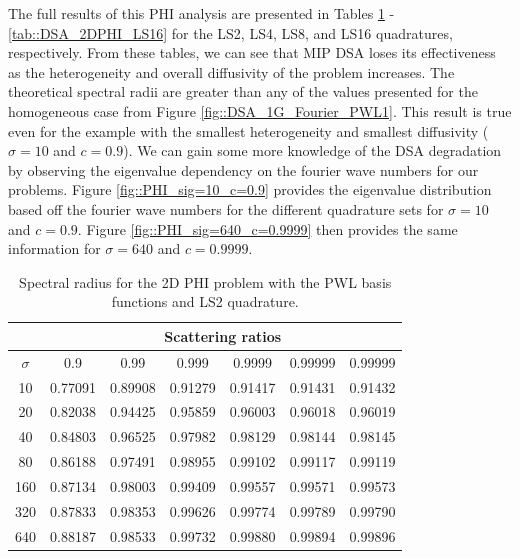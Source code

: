 The full results of this PHI analysis are presented in Tables \ref{tab::DSA_2DPHI_LS2} - \ref{tab::DSA_2DPHI_LS16} for the LS2, LS4, LS8, and LS16 quadratures, respectively. From these tables, we can see that MIP DSA loses its effectiveness as the heterogeneity and overall diffusivity of the problem increases. The theoretical spectral radii are greater than any of the values presented for the homogeneous case from Figure \ref{fig::DSA_1G_Fourier_PWL1}. This result is true even for the example with the smallest heterogeneity and smallest diffusivity ($\sigma=10$ and $c=0.9$). We can gain some more knowledge of the DSA degradation by observing the eigenvalue dependency on the fourier wave numbers for our problems. Figure \ref{fig::PHI_sig=10_c=0.9} provides the eigenvalue distribution based off the fourier wave numbers for the different quadrature sets for $\sigma=10$ and $c=0.9$. Figure \ref{fig::PHI_sig=640_c=0.9999} then provides the same information for $\sigma=640$ and $c=0.9999$.

\begin{table}
\caption{Spectral radius for the 2D PHI problem with the PWL basis functions and LS2 quadrature.}
\begin{center}
\def\arraystretch{1.6}
\begin{tabular}{|c|c|c|c|c|c|c|}
\hline
& \multicolumn{6}{c}{Scattering ratios}\vline\\
\hline
$\sigma$ & 0.9 & 0.99& 0.999& 0.9999& 0.99999& 0.99999 \\
\hline
10  &0.77091&0.89908&0.91279&0.91417&0.91431&0.91432 \\
20  &0.82038&0.94425&0.95859&0.96003&0.96018&0.96019  \\
40  &0.84803&0.96525&0.97982&0.98129&0.98144&0.98145  \\
80  &0.86188&0.97491&0.98955&0.99102&0.99117&0.99119  \\
160&0.87134&0.98003&0.99409&0.99557&0.99571&0.99573  \\
320&0.87833&0.98353&0.99626&0.99774&0.99789&0.99790  \\
640&0.88187&0.98533&0.99732&0.99880&0.99894&0.99896  \\
\hline
\end{tabular}
\end{center}
\label{tab::DSA_2DPHI_LS2}
\end{table}

